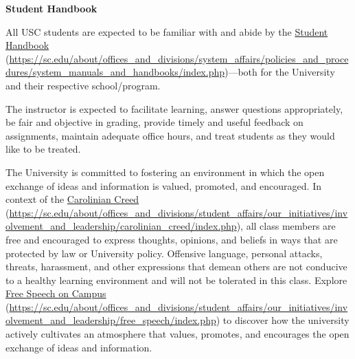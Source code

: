 \documentclass[11pt,letterpaper]{article}
\begin{document}
{\bfseries Student Handbook} \par
All USC students are expected to be familiar with and abide by the \href{https://sc.edu/about/offices_and_divisions/system_affairs/policies_and_procedures/system_manuals_and_handbooks/index.php}{Student Handbook} (\url{https://sc.edu/about/offices_and_divisions/system_affairs/policies_and_procedures/system_manuals_and_handbooks/index.php})---both for the University and their respective school/program. 
\sectionbreak




The instructor is expected to facilitate learning, answer questions appropriately, be fair and objective in grading, provide timely and useful feedback on assignments, maintain adequate office hours, and treat students as they would like to be treated. \sectionbreak




The University is committed to fostering an environment in which the open exchange of ideas and information is valued, promoted, and encouraged.  In context of the \href{https://sc.edu/about/offices\_and\_divisions/student\_affairs/our\_initiatives/involvement\_and\_leadership/carolinian\_creed/index.php}{Carolinian Creed} (\url{https://sc.edu/about/offices\_and\_divisions/student\_affairs/our\_initiatives/involvement\_and\_leadership/carolinian\_creed/index.php}), all class members are free and encouraged to express thoughts, opinions, and beliefs in ways that are protected by law or University policy. Offensive language, personal attacks, threats, harassment, and other expressions that demean others are not conducive to a healthy learning environment and will not be tolerated in this class. Explore \href{https://sc.edu/about/offices\_and\_divisions/student\_affairs/our\_initiatives/involvement\_and\_leadership/free\_speech/index.php}{Free Speech on Campus} (\url{https://sc.edu/about/offices\_and\_divisions/student\_affairs/our\_initiatives/involvement\_and\_leadership/free\_speech/index.php}) to discover how the university actively cultivates an atmosphere that values, promotes, and encourages the open exchange of ideas and information. \par\vspace{0.4cm}
\end{document}
